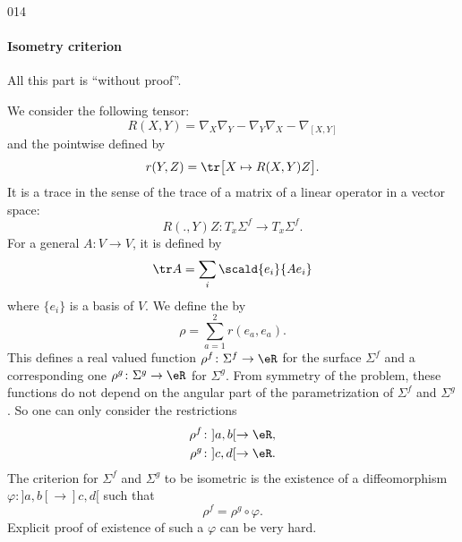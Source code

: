 \begin{corrige}{014}
\paragraph{Isometry criterion} All this part is ``without proof''.

We consider the following tensor:
\[ 
  R(X,Y)=\nabla_X\nabla_Y-\nabla_Y\nabla_X-\nabla_{[X,Y]}
\]
and the  pointwise defined by
\[ 
  r(Y,Z)=\tr\big[ X\mapsto R(X,Y)Z \big].
\]
It is a trace in the sense of the trace of a matrix of a linear operator in a vector space: 
\begin{equation}
R(.,Y)Z\colon T_x\Sigma^f\to T_x\Sigma^f. 
\end{equation}
For a general $A\colon V\to V$, it is defined by
\[ 
  \tr A=\sum_i\scald{ e_i }{ Ae_i }
\]
where $\{ e_i \}$ is a basis of $V$. We define the  by
\[ 
  \rho=\sum_{a=1}^2r(e_a,e_a).
\]
This defines a real valued function $\rho^f\colon \Sigma^f\to \eR$  for the surface $\Sigma^f$ and a corresponding one $\rho^g\colon \Sigma^g\to \eR$ for $\Sigma^g$. From symmetry of the problem, these functions do not depend on the angular part of the parametrization of $\Sigma^f$ and $\Sigma^g$. So one can only consider the restrictions
\begin{subequations}
\begin{align}
\rho^f&\colon ]a,b[\to \eR,\\
\rho^g&\colon ]c,d[\to \eR.
\end{align}
\end{subequations}
The criterion for $\Sigma^f$ and $\Sigma^g$ to be isometric is the existence of a diffeomorphism $\varphi\colon ]a,b[\to ]c,d[$ such that 
\[ 
  \rho^f=\rho^g\circ\varphi.
\]
Explicit proof of existence of such a $\varphi$ can be very hard.


\end{corrige}
